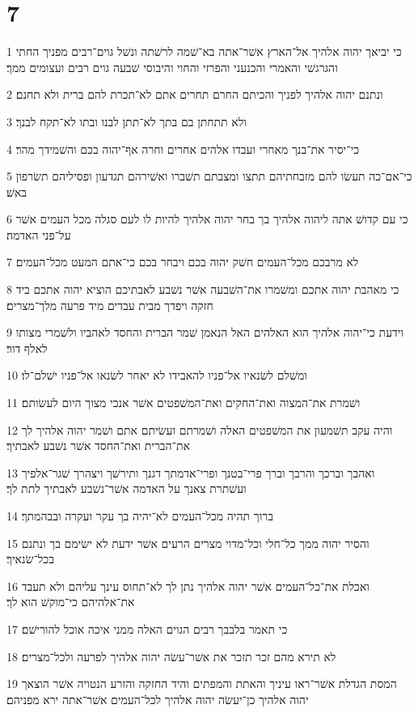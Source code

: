 \chapter{7}

\par 1 כי יביאך יהוה אלהיך אל־הארץ אשׁר־אתה בא־שׁמה לרשׁתה ונשׁל גוים־רבים מפניך החתי והגרגשׁי והאמרי והכנעני והפרזי והחוי והיבוסי שׁבעה גוים רבים ועצומים ממך׃
\par 2 ונתנם יהוה אלהיך לפניך והכיתם החרם תחרים אתם לא־תכרת להם ברית ולא תחנם׃
\par 3 ולא תתחתן בם בתך לא־תתן לבנו ובתו לא־תקח לבנך׃
\par 4 כי־יסיר את־בנך מאחרי ועבדו אלהים אחרים וחרה אף־יהוה בכם והשׁמידך מהר׃
\par 5 כי־אם־כה תעשׂו להם מזבחתיהם תתצו ומצבתם תשׁברו ואשׁירהם תגדעון ופסיליהם תשׂרפון באשׁ׃
\par 6 כי עם קדושׁ אתה ליהוה אלהיך בך בחר יהוה אלהיך להיות לו לעם סגלה מכל העמים אשׁר על־פני האדמה׃
\par 7 לא מרבכם מכל־העמים חשׁק יהוה בכם ויבחר בכם כי־אתם המעט מכל־העמים׃
\par 8 כי מאהבת יהוה אתכם ומשׁמרו את־השׁבעה אשׁר נשׁבע לאבתיכם הוציא יהוה אתכם ביד חזקה ויפדך מבית עבדים מיד פרעה מלך־מצרים׃
\par 9 וידעת כי־יהוה אלהיך הוא האלהים האל הנאמן שׁמר הברית והחסד לאהביו ולשׁמרי מצותו לאלף דור׃
\par 10 ומשׁלם לשׂנאיו אל־פניו להאבידו לא יאחר לשׂנאו אל־פניו ישׁלם־לו׃
\par 11 ושׁמרת את־המצוה ואת־החקים ואת־המשׁפטים אשׁר אנכי מצוך היום לעשׂותם׃
\par 12 והיה עקב תשׁמעון את המשׁפטים האלה ושׁמרתם ועשׂיתם אתם ושׁמר יהוה אלהיך לך את־הברית ואת־החסד אשׁר נשׁבע לאבתיך׃
\par 13 ואהבך וברכך והרבך וברך פרי־בטנך ופרי־אדמתך דגנך ותירשׁך ויצהרך שׁגר־אלפיך ועשׁתרת צאנך על האדמה אשׁר־נשׁבע לאבתיך לתת לך׃
\par 14 ברוך תהיה מכל־העמים לא־יהיה בך עקר ועקרה ובבהמתך׃
\par 15 והסיר יהוה ממך כל־חלי וכל־מדוי מצרים הרעים אשׁר ידעת לא ישׂימם בך ונתנם בכל־שׂנאיך׃
\par 16 ואכלת את־כל־העמים אשׁר יהוה אלהיך נתן לך לא־תחוס עינך עליהם ולא תעבד את־אלהיהם כי־מוקשׁ הוא לך׃
\par 17 כי תאמר בלבבך רבים הגוים האלה ממני איכה אוכל להורישׁם׃
\par 18 לא תירא מהם זכר תזכר את אשׁר־עשׂה יהוה אלהיך לפרעה ולכל־מצרים׃
\par 19 המסת הגדלת אשׁר־ראו עיניך והאתת והמפתים והיד החזקה והזרע הנטויה אשׁר הוצאך יהוה אלהיך כן־יעשׂה יהוה אלהיך לכל־העמים אשׁר־אתה ירא מפניהם׃
